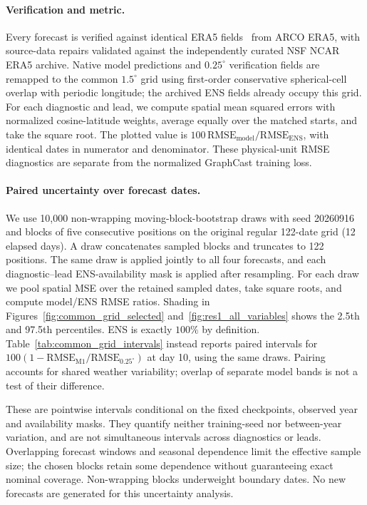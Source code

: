 \documentclass{article}
\newcommand{\vfourchange}[1]{{\color{blue}#1}}
\begin{document}
\paragraph{\vfourchange{Verification and metric.}}
\vfourchange{Every forecast is verified against identical ERA5 fields~\citep{hersbach2020era5} from ARCO ERA5, with source-data repairs validated against the independently curated NSF NCAR ERA5 archive. Native model predictions and $0.25^\circ$ verification fields are remapped to the common $1.5^\circ$ grid using first-order conservative spherical-cell overlap with periodic longitude; the archived ENS fields already occupy this grid. For each diagnostic and lead, we compute spatial mean squared errors with normalized cosine-latitude weights, average equally over the matched starts, and take the square root. The plotted value is $100\,\mathrm{RMSE}_{\mathrm{model}}/\mathrm{RMSE}_{\mathrm{ENS}}$, with identical dates in numerator and denominator. These physical-unit RMSE diagnostics are separate from the normalized GraphCast training loss.}

\paragraph{\vfourchange{Paired uncertainty over forecast dates.}}
\vfourchange{We use 10,000 non-wrapping moving-block-bootstrap draws with seed 20260916 and blocks of five consecutive positions on the original regular 122-date grid (12 elapsed days). A draw concatenates sampled blocks and truncates to 122 positions. The same draw is applied jointly to all four forecasts, and each diagnostic--lead ENS-availability mask is applied after resampling. For each draw we pool spatial MSE over the retained sampled dates, take square roots, and compute model/ENS RMSE ratios. Shading in Figures~\ref{fig:common_grid_selected} and~\ref{fig:res1_all_variables} shows the 2.5th and 97.5th percentiles. ENS is exactly $100\%$ by definition. Table~\ref{tab:common_grid_intervals} instead reports paired intervals for $100(1-\mathrm{RMSE}_{\mathrm{M1}}/\mathrm{RMSE}_{0.25^\circ})$ at day 10, using the same draws. Pairing accounts for shared weather variability; overlap of separate model bands is not a test of their difference.}

\vfourchange{These are pointwise intervals conditional on the fixed checkpoints, observed year and availability masks. They quantify neither training-seed nor between-year variation, and are not simultaneous intervals across diagnostics or leads. Overlapping forecast windows and seasonal dependence limit the effective sample size; the chosen blocks retain some dependence without guaranteeing exact nominal coverage. Non-wrapping blocks underweight boundary dates. No new forecasts are generated for this uncertainty analysis.}
\end{document}
